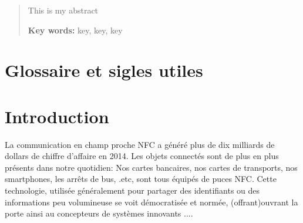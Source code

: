 \documentclass{themeensg}
\begin{document}
\begin{abstract}
\thispagestyle{empty}
	\vspace{1cm}
	
	This is my abstract
	
	\vspace{1.5cm}
	
	\textbf{Key words:} key, key, key
\end{abstract}


\tableofcontents

\newevenpage
\listoffigures

\newevenpage
\listoftables

\chapter*{Glossaire et sigles utiles}

  \begin{acronym}
  \end{acronym}


\newevenpage
\chapter*{Introduction}
  
  \vspace{1.5cm}
  
	La communication en champ proche NFC a généré plus de dix milliards de dollars de chiffre d'affaire en 2014. Les objets connectés sont de plus en plus présents dans notre quotidien: Nos cartes bancaires, nos cartes de transports, nos smartphones, les arrêts de bus, .etc, sont tous équipés de puces NFC. Cette technologie, utilisée généralement pour partager des identifiants ou des informations peu volumineuse se voit démocratisée et normée, (offrant)ouvrant la porte ainsi au concepteurs de systèmes innovants ....
	
\end{document}
